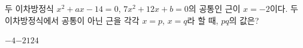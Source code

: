 두 이차방정식 $x^2+ax-14=0$, $7x^2+12x+b=0$의 공통인 근이 $x=-2$이다. 두 이차방정식에서 공통이 아닌 근을 각각 $x=p$, $x=q$라 할 때, $pq$의 값은? 
\begin{choices32}{$-4$}{$-2$}{$1$}{$2$}{$4$}\end{choices32}
